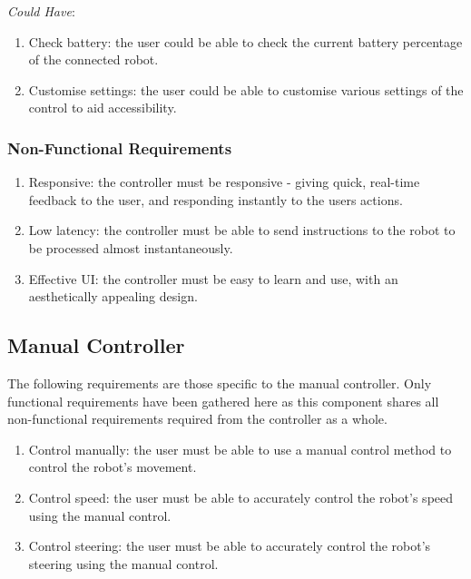 \documentclass{l4proj}
\begin{document}
\textit{Could Have}:
\begin{enumerate}[label=\arabic{chapter}.\arabic*]
    \item Check battery: the user could be able to check the current battery percentage of the connected robot.
    \item Customise settings: the user could be able to customise various settings of the control to aid accessibility.
\end{enumerate}

\subsubsection{Non-Functional Requirements}
\begin{enumerate}[label=\arabic{chapter}.\arabic*]
    \item Responsive: the controller must be responsive - giving quick, real-time feedback to the user, and responding instantly to the users actions.
    \item Low latency: the controller must be able to send instructions to the robot to be processed almost instantaneously.
    \item Effective UI: the controller must be easy to learn and use, with an aesthetically appealing design.
\end{enumerate}

\subsection{Manual Controller}
The following requirements are those specific to the manual controller. Only functional requirements have been gathered here as this component shares all non-functional requirements required from the controller as a whole.
\begin{enumerate}[label=\arabic{chapter}.\arabic*]
    \item Control manually: the user must be able to use a manual control method to control the robot’s movement.
    \item Control speed: the user must be able to accurately control the robot’s speed using the manual control.
    \item Control steering: the user must be able to accurately control the robot’s steering using the manual control.
\end{enumerate}
\end{document}
